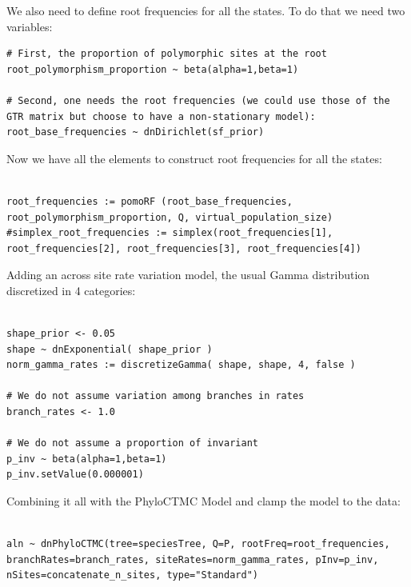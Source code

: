 \documentclass[11pt]{article}
\begin{document}
{\begin{framed}
We also need to define root frequencies for all the states.
To do that we need two variables:

 {\tt \begin{snugshade*}
\begin{lstlisting}
# First, the proportion of polymorphic sites at the root
root_polymorphism_proportion ~ beta(alpha=1,beta=1)

# Second, one needs the root frequencies (we could use those of the GTR matrix but choose to have a non-stationary model):
root_base_frequencies ~ dnDirichlet(sf_prior)
\end{lstlisting}
\end{snugshade*}}

Now we have all the elements to construct root frequencies for all the states:
 {\tt \begin{snugshade*}
\begin{lstlisting}

root_frequencies := pomoRF (root_base_frequencies, root_polymorphism_proportion, Q, virtual_population_size)
#simplex_root_frequencies := simplex(root_frequencies[1], root_frequencies[2], root_frequencies[3], root_frequencies[4])

\end{lstlisting}
\end{snugshade*}}

Adding an across site rate variation model, the usual Gamma distribution discretized in 4 categories:
 {\tt \begin{snugshade*}
\begin{lstlisting}

shape_prior <- 0.05 
shape ~ dnExponential( shape_prior )
norm_gamma_rates := discretizeGamma( shape, shape, 4, false )

# We do not assume variation among branches in rates
branch_rates <- 1.0

# We do not assume a proportion of invariant
p_inv ~ beta(alpha=1,beta=1)
p_inv.setValue(0.000001)
\end{lstlisting}
\end{snugshade*}}

Combining it all with the PhyloCTMC Model and clamp the model to the data:
 {\tt \begin{snugshade*}
\begin{lstlisting}

aln ~ dnPhyloCTMC(tree=speciesTree, Q=P, rootFreq=root_frequencies, branchRates=branch_rates, siteRates=norm_gamma_rates, pInv=p_inv, nSites=concatenate_n_sites, type="Standard")


\end{lstlisting}
\end{snugshade*}}
\end{framed}}
\end{document}
